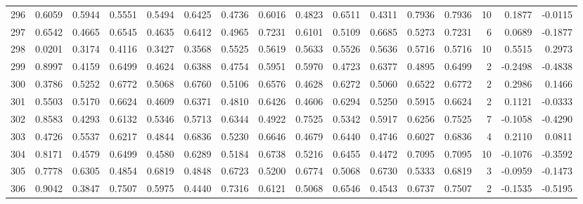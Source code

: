 \begin{tabular}{lrrrrrrrrrrrrrrr}
296 &      0.6059 &  0.5944 &  0.5551 &  0.5494 &  0.6425 &  0.4736 &  0.6016 &  0.4823 &  0.6511 &  0.4311 &   0.7936 &     0.7936 &     10 &                    0.1877 &                    -0.0115 \\
297 &      0.6542 &  0.4665 &  0.6545 &  0.4635 &  0.6412 &  0.4965 &  0.7231 &  0.6101 &  0.5109 &  0.6685 &   0.5273 &     0.7231 &      6 &                    0.0689 &                    -0.1877 \\
298 &      0.0201 &  0.3174 &  0.4116 &  0.3427 &  0.3568 &  0.5525 &  0.5619 &  0.5633 &  0.5526 &  0.5636 &   0.5716 &     0.5716 &     10 &                    0.5515 &                     0.2973 \\
299 &      0.8997 &  0.4159 &  0.6499 &  0.4624 &  0.6388 &  0.4754 &  0.5951 &  0.5970 &  0.4723 &  0.6377 &   0.4895 &     0.6499 &      2 &                   -0.2498 &                    -0.4838 \\
300 &      0.3786 &  0.5252 &  0.6772 &  0.5068 &  0.6760 &  0.5106 &  0.6576 &  0.4628 &  0.6272 &  0.5060 &   0.6522 &     0.6772 &      2 &                    0.2986 &                     0.1466 \\
301 &      0.5503 &  0.5170 &  0.6624 &  0.4609 &  0.6371 &  0.4810 &  0.6426 &  0.4606 &  0.6294 &  0.5250 &   0.5915 &     0.6624 &      2 &                    0.1121 &                    -0.0333 \\
302 &      0.8583 &  0.4293 &  0.6132 &  0.5346 &  0.5713 &  0.6344 &  0.4922 &  0.7525 &  0.5342 &  0.5917 &   0.6256 &     0.7525 &      7 &                   -0.1058 &                    -0.4290 \\
303 &      0.4726 &  0.5537 &  0.6217 &  0.4844 &  0.6836 &  0.5230 &  0.6646 &  0.4679 &  0.6440 &  0.4746 &   0.6027 &     0.6836 &      4 &                    0.2110 &                     0.0811 \\
304 &      0.8171 &  0.4579 &  0.6499 &  0.4580 &  0.6289 &  0.5184 &  0.6738 &  0.5216 &  0.6455 &  0.4472 &   0.7095 &     0.7095 &     10 &                   -0.1076 &                    -0.3592 \\
305 &      0.7778 &  0.6305 &  0.4854 &  0.6819 &  0.4848 &  0.6723 &  0.5200 &  0.6774 &  0.5068 &  0.6730 &   0.5333 &     0.6819 &      3 &                   -0.0959 &                    -0.1473 \\
306 &      0.9042 &  0.3847 &  0.7507 &  0.5975 &  0.4440 &  0.7316 &  0.6121 &  0.5068 &  0.6546 &  0.4543 &   0.6737 &     0.7507 &      2 &                   -0.1535 &                    -0.5195 \\

\end{tabular}
